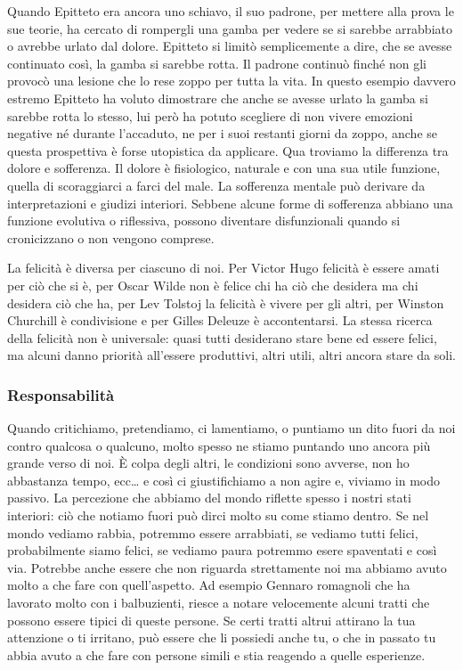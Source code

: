 \documentclass[12pt]{book} %
\begin{document}
Quando Epitteto era ancora uno schiavo, il suo padrone, per mettere alla prova le sue teorie, ha cercato di rompergli
una gamba per vedere se si sarebbe arrabbiato o avrebbe urlato dal dolore. Epitteto si limitò semplicemente a dire, che
se avesse continuato così, la gamba si sarebbe rotta. Il padrone continuò finché non gli provocò una lesione che lo
rese zoppo per tutta la vita. In questo esempio davvero estremo Epitteto ha voluto dimostrare che anche se avesse
urlato la gamba si sarebbe rotta lo stesso, lui però ha potuto scegliere di non vivere emozioni negative né durante
l'accaduto, ne per i suoi restanti giorni da zoppo, anche se questa prospettiva è forse utopistica da applicare. Qua troviamo la differenza tra dolore e
sofferenza. Il dolore è fisiologico, naturale e con una sua utile funzione, quella di scoraggiarci a farci del male. La sofferenza mentale può derivare da interpretazioni e giudizi interiori. Sebbene alcune forme di sofferenza abbiano una funzione evolutiva o riflessiva, possono diventare disfunzionali quando si cronicizzano o non vengono comprese.

La felicità è diversa per ciascuno di noi. Per Victor Hugo felicità è essere amati per ciò che si è, per Oscar Wilde non
è felice chi ha ciò che desidera ma chi desidera ciò che ha, per Lev Tolstoj la felicità è vivere per gli altri, per
Winston Churchill è condivisione e per Gilles Deleuze è accontentarsi. La stessa ricerca della felicità non è
universale: quasi tutti desiderano stare bene ed essere felici, ma alcuni danno priorità all'essere produttivi, altri utili, altri
ancora stare da soli.

\subsubsection{Responsabilità}
Quando critichiamo, pretendiamo, ci
lamentiamo, o puntiamo un dito fuori da noi contro qualcosa o qualcuno, molto spesso ne stiamo puntando uno
ancora più grande verso di noi. È colpa degli altri, le condizioni sono avverse, non ho abbastanza tempo, ecc… e
così ci giustifichiamo a non agire e, viviamo in modo passivo. La percezione che abbiamo del mondo riflette spesso i nostri stati interiori: ciò che notiamo fuori può dirci molto su come stiamo dentro. Se nel mondo vediamo rabbia, potremmo essere arrabbiati, se vediamo tutti felici, probabilmente siamo
felici, se vediamo paura potremmo esere spaventati e così via. Potrebbe anche essere che non riguarda strettamente noi ma abbiamo avuto molto a che fare con quell'aspetto. Ad esempio Gennaro romagnoli che ha lavorato molto con i balbuzienti, riesce a notare velocemente alcuni tratti che possono essere tipici di queste persone. Se certi tratti altrui attirano la tua attenzione o ti irritano, può essere che li possiedi anche tu, o che in passato tu abbia avuto a che fare con persone simili e stia reagendo a quelle esperienze.
\end{document}
